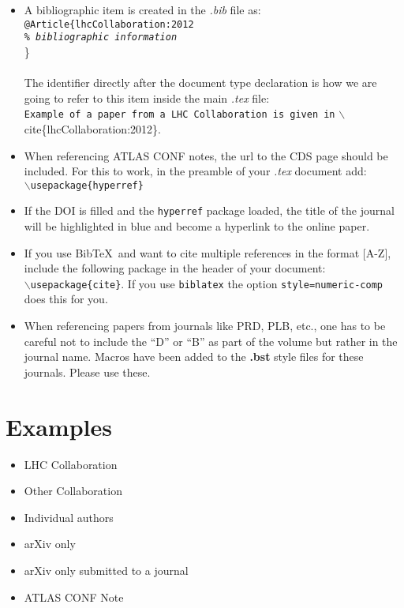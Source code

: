 \documentclass[UKenglish]{style/atlasdoc}
\newcommand*{\BibTeX}{Bib\TeX}
\begin{document}
\begin{itemize}
\item A bibliographic item is created in the \emph{.bib} file as: \\
	\texttt{@Article\{lhcCollaboration:2012 \\ \emph{\% bibliographic information}} \\ \} \\
	\\
	The identifier directly after the document type declaration is how we are going to refer to this item inside the main \emph{.tex} file: \\
	{\small{\texttt{Example of a paper from a LHC Collaboration is given in} $\backslash$cite\{lhcCollaboration:2012\}.}}
\item When referencing ATLAS CONF notes, the url to the CDS page should be included. For this to work, in the preamble of your \emph{.tex} document add: \\
	\texttt{$\backslash$usepackage\{hyperref\}}
\item If the DOI is filled and the \texttt{hyperref} package loaded, the title of the journal will be highlighted in blue and become a hyperlink to the online paper.
\item If you use \BibTeX\ and want to cite multiple references in the format [A-Z], include the following package in the 	header of your document: \\
	\texttt{$\backslash$usepackage\{cite\}}.
	If you use \texttt{biblatex} the option \texttt{style=numeric-comp} does this for you.
\item When referencing papers from journals like PRD, PLB, etc.,
	one has to be careful not to include the ``D'' or ``B'' as part of the volume but rather in the journal name. 
	Macros have been added to the \textbf{.bst} style files for these journals. Please use these.
\end{itemize}


\section{Examples}

\begin{itemize}
	\item LHC Collaboration~\cite{lhcCollaboration:2012}
	\item Other Collaboration~\cite{otherCollaboration:2007}
	\item Individual authors~\cite{authors:2008}
	\item arXiv only~\cite{arxivOnly:2009}
	\item arXiv only submitted to a journal~\cite{arxivSub:2011}
	\item ATLAS CONF Note~\cite{atlasConf:2012} 
\end{itemize}
\end{document}
